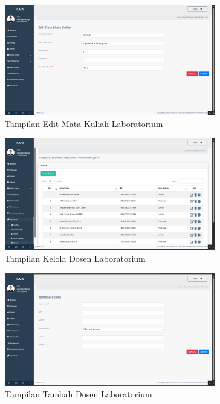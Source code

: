 \begin{figure}
	\centering
	\includegraphics[width=0.82\textwidth]{konten/gambar/hasil/edit-matkul.png}
	\caption{Tampilan Edit Mata Kuliah Laboratorium}
	\label{fig:edit-matkul}
\end{figure}

\begin{figure}
	\centering
	\includegraphics[width=0.82\textwidth]{konten/gambar/hasil/dosen.png}
	\caption{Tampilan Kelola Dosen Laboratorium}
	\label{fig:dosen}
\end{figure}

\begin{figure}
	\centering
	\includegraphics[width=0.82\textwidth]{konten/gambar/hasil/tambah-dosen.png}
	\caption{Tampilan Tambah Dosen Laboratorium}
	\label{fig:tambah-dosen}
\end{figure}

